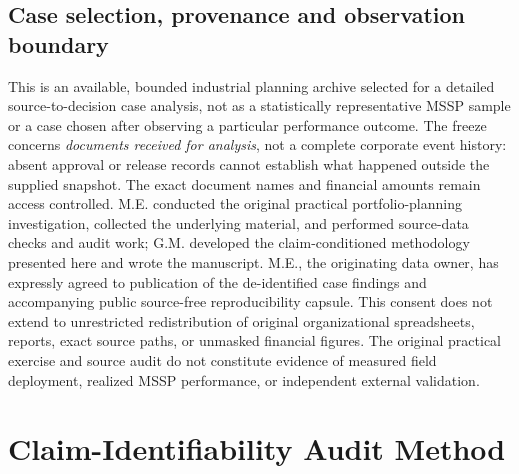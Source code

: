 \documentclass[systems,article,submit,moreauthors]{Definitions/mdpi}
\begin{document}
\subsection{Case selection, provenance and observation boundary}
This is an available, bounded industrial planning archive selected for a detailed source-to-decision case analysis, not as a statistically representative MSSP sample or a case chosen after observing a particular performance outcome. The freeze concerns \emph{documents received for analysis}, not a complete corporate event history: absent approval or release records cannot establish what happened outside the supplied snapshot. The exact document names and financial amounts remain access controlled. M.E. conducted the original practical portfolio-planning investigation, collected the underlying material, and performed source-data checks and audit work; G.M. developed the claim-conditioned methodology presented here and wrote the manuscript. M.E., the originating data owner, has expressly agreed to publication of the de-identified case findings and accompanying public source-free reproducibility capsule. This consent does not extend to unrestricted redistribution of original organizational spreadsheets, reports, exact source paths, or unmasked financial figures. The original practical exercise and source audit do not constitute evidence of measured field deployment, realized MSSP performance, or independent external validation.\label{sec:case-provenance}


\section{Claim-Identifiability Audit Method}
\end{document}
